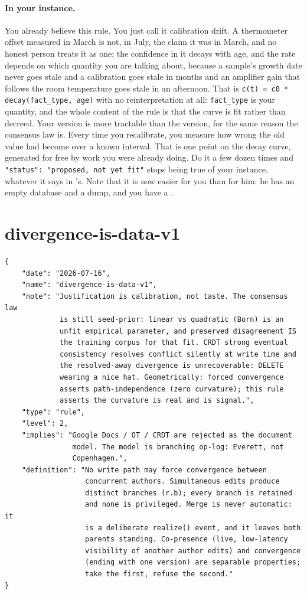 \paragraph{In your instance.} You already believe this rule. You just call it calibration drift. A thermometer offset measured in March is not, in July, the claim it was in March, and no honest person treats it as one; the confidence in it decays with age, and the rate depends on which quantity you are talking about, because a sample's growth date never goes stale and a \labColdComponent{} calibration goes stale in months and an amplifier gain that follows the room temperature goes stale in an afternoon. That is \texttt{c(t) = c0 * decay(fact\_type, age)} with no reinterpretation at all: \texttt{fact\_type} is your quantity, and the whole content of the rule is that the curve is fit rather than decreed. Your version is more tractable than the \labDomain{} version, for the same reason the consensus law is. Every time you recalibrate, you measure how wrong the old value had become over a known interval. That is one point on the decay curve, generated for free by work you were already doing. Do it a few dozen times and \texttt{"status": "proposed, not yet fit"} stops being true of your instance, whatever it says in \labPI's. Note that it is now easier for you than for him: he has an empty database and a dump, and you have a \labColdSystemShort.

\section{divergence-is-data-v1}

\begin{lstlisting}[language={},basicstyle=\ttfamily\footnotesize]
{
    "date": "2026-07-16",
    "name": "divergence-is-data-v1",
    "note": "Justification is calibration, not taste. The consensus law
             is still seed-prior: linear vs quadratic (Born) is an
             unfit empirical parameter, and preserved disagreement IS
             the training corpus for that fit. CRDT strong eventual
             consistency resolves conflict silently at write time and
             the resolved-away divergence is unrecoverable: DELETE
             wearing a nice hat. Geometrically: forced convergence
             asserts path-independence (zero curvature); this rule
             asserts the curvature is real and is signal.",
    "type": "rule",
    "level": 2,
    "implies": "Google Docs / OT / CRDT are rejected as the document
                model. The model is branching op-log: Everett, not
                Copenhagen.",
    "definition": "No write path may force convergence between
                   concurrent authors. Simultaneous edits produce
                   distinct branches (r.b); every branch is retained
                   and none is privileged. Merge is never automatic: it
                   is a deliberate realize() event, and it leaves both
                   parents standing. Co-presence (live, low-latency
                   visibility of another author edits) and convergence
                   (ending with one version) are separable properties;
                   take the first, refuse the second."
}
\end{lstlisting}

